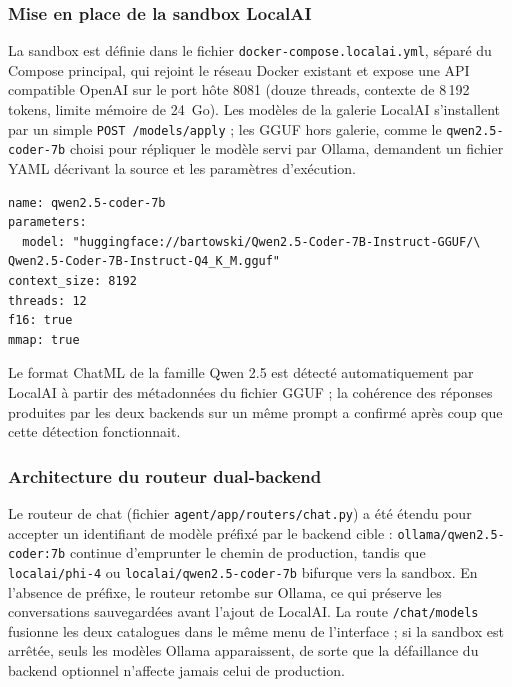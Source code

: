         \subsubsection{Mise en place de la sandbox LocalAI}

        La sandbox est définie dans le fichier \texttt{docker-compose.\allowbreak{}localai.\allowbreak{}yml},
        séparé du Compose principal, qui rejoint le réseau Docker existant et expose
        une API compatible OpenAI sur le port hôte 8081 (douze threads, contexte de
        8\,192 tokens, limite mémoire de 24~Go). Les modèles de la galerie LocalAI
        s'installent par un simple \texttt{POST /\allowbreak{}models/\allowbreak{}apply} ; les GGUF hors
        galerie, comme le \texttt{qwen2.\allowbreak{}5-coder-7b} choisi pour répliquer le modèle
        servi par Ollama, demandent un fichier YAML décrivant la source et les
        paramètres d'exécution.

        \begin{lstlisting}[style=yaml, caption={Configuration LocalAI du modèle Qwen2.5-Coder 7B, identique à celui servi par Ollama}, label={lst:localai_qwen_yaml}]
name: qwen2.5-coder-7b
parameters:
  model: "huggingface://bartowski/Qwen2.5-Coder-7B-Instruct-GGUF/\
Qwen2.5-Coder-7B-Instruct-Q4_K_M.gguf"
context_size: 8192
threads: 12
f16: true
mmap: true
        \end{lstlisting}

        Le format ChatML de la famille Qwen 2.5 est détecté automatiquement par
        LocalAI à partir des métadonnées du fichier GGUF ; la cohérence des réponses
        produites par les deux backends sur un même prompt a confirmé après coup que
        cette détection fonctionnait.

        \subsubsection{Architecture du routeur dual-backend}

        Le routeur de chat (fichier \texttt{agent/\allowbreak{}app/\allowbreak{}routers/\allowbreak{}chat.\allowbreak{}py}) a été étendu
        pour accepter un identifiant de modèle préfixé par le backend cible :
        \texttt{ollama/\allowbreak{}qwen2.\allowbreak{}5-coder:7b} continue d'emprunter le chemin de production,
        tandis que \texttt{localai/\allowbreak{}phi-4} ou \texttt{localai/\allowbreak{}qwen2.\allowbreak{}5-coder-7b}
        bifurque vers la sandbox. En l'absence de préfixe, le routeur retombe sur
        Ollama, ce qui préserve les conversations sauvegardées avant l'ajout de
        LocalAI. La route \texttt{/\allowbreak{}chat/\allowbreak{}models} fusionne les deux catalogues dans le
        même menu de l'interface ; si la sandbox est arrêtée, seuls les modèles
        Ollama apparaissent, de sorte que la défaillance du backend optionnel
        n'affecte jamais celui de production.

